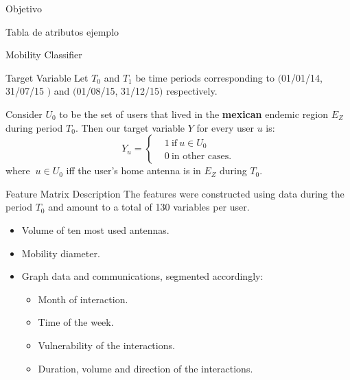 \documentclass[xcolor=x11names]{beamer}
\begin{document}
\begin{frame}{Objetivo}
\begin{frame}{Tabla de atributos ejemplo}
\end{frame}

\begin{frame}{Mobility Classifier}
			\begin{block}{Target Variable}
			Let $T_0$ and $T_1$ be time periods corresponding to $($01/01/14, 31/07/15 $)$ and $($01/08/15, 31/12/15$)$ respectively.

			Consider $U_0$ to be the set of users that lived in the \textbf{mexican} endemic region $E_Z$ during period $T_0$. Then our target variable $Y$ for every user $u$ is:
			\[
			Y_u =
			\begin{cases}
			&1 \ \mbox{if} \ u \in U_0  \\
			&0 \ \mbox{in other cases}.
			\end{cases}
			\]
			where $\ u \in U_0$ iff the user's home antenna is in $E_Z$ during $T_0$.
			\end{block}

\end{frame}

\begin{frame}{Feature Matrix Description}
	The features were constructed using data during the period $T_0$ and amount to a total of 130 variables per user.

	\begin{itemize}
		\item Volume of ten most used antennas.
		\item Mobility diameter.
		\item Graph data and communications, segmented accordingly:
		\begin{itemize}
			\item Month of interaction.
			\item Time of the week.
			\item Vulnerability of the interactions.
			\item Duration, volume and direction of the interactions.
		\end{itemize}
	\end{itemize}


\end{frame}
\end{frame}
\end{document}
